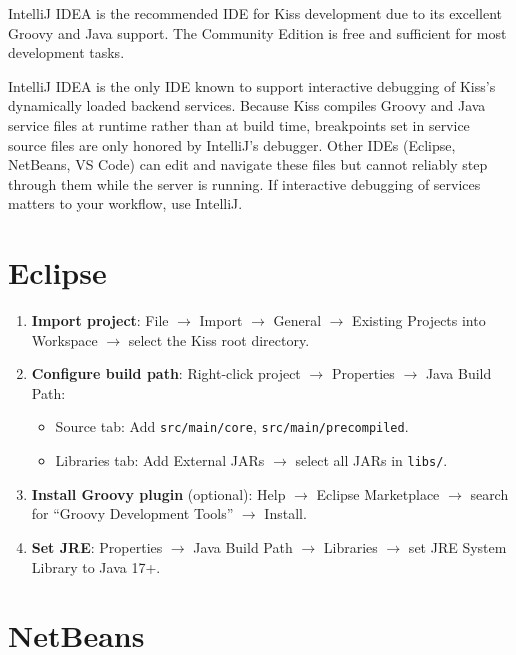 \begin{tipbox}
IntelliJ IDEA is the recommended IDE for Kiss development due to its excellent Groovy and Java support.  The Community Edition is free and sufficient for most development tasks.
\end{tipbox}

\begin{notebox}
IntelliJ IDEA is the only IDE known to support interactive debugging of Kiss's dynamically loaded backend services.  Because Kiss compiles Groovy and Java service files at runtime rather than at build time, breakpoints set in service source files are only honored by IntelliJ's debugger.  Other IDEs (Eclipse, NetBeans, VS Code) can edit and navigate these files but cannot reliably step through them while the server is running.  If interactive debugging of services matters to your workflow, use IntelliJ.
\end{notebox}

\section{Eclipse}
\label{sec:ide-eclipse}

\begin{enumerate}
  \item \textbf{Import project}: File $\rightarrow$ Import $\rightarrow$ General $\rightarrow$ Existing Projects into Workspace $\rightarrow$ select the Kiss root directory.
  \item \textbf{Configure build path}: Right-click project $\rightarrow$ Properties $\rightarrow$ Java Build Path:
  \begin{itemize}
    \item Source tab: Add \texttt{src/main/core}, \texttt{src/main/precompiled}.
    \item Libraries tab: Add External JARs $\rightarrow$ select all JARs in \texttt{libs/}.
  \end{itemize}
  \item \textbf{Install Groovy plugin} (optional): Help $\rightarrow$ Eclipse Marketplace $\rightarrow$ search for ``Groovy Development Tools'' $\rightarrow$ Install.
  \item \textbf{Set JRE}: Properties $\rightarrow$ Java Build Path $\rightarrow$ Libraries $\rightarrow$ set JRE System Library to Java 17+.
\end{enumerate}

\section{NetBeans}
\label{sec:ide-netbeans}

